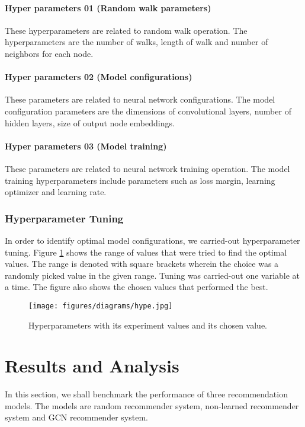 \documentclass{kththesis}
\begin{document}
\subsubsection{Hyper parameters 01 (Random walk parameters)}
\noindent These hyperparameters are related to random walk operation. The hyperparameters are the number of walks, length of walk and number of neighbors for each node.

\subsubsection{Hyper parameters 02 (Model configurations)}
\noindent These parameters are related to neural network configurations. The model configuration parameters are the dimensions of convolutional layers, number of hidden layers, size of output node embeddings.

\subsubsection{Hyper parameters 03 (Model training)}
\noindent These parameters are related to neural network training operation. The model training hyperparameters include parameters such as loss margin, learning optimizer and learning rate. 

\subsection{Hyperparameter Tuning}
In order to identify optimal model configurations, we carried-out hyperparameter tuning. Figure \ref{fig:hype} shows the range of values that were tried to find the optimal values. The range is denoted with square brackets wherein the choice was a randomly picked value in the given range. Tuning was carried-out one variable at a time. The figure also shows the chosen values that performed the best.

\begin{figure}[h!]
\centering
\texttt{[image: figures/diagrams/hype.jpg]}
\caption{Hyperparameters with its experiment values and its chosen value.}
\label{fig:hype}
\end{figure}

\chapter{Results and Analysis}
In this section, we shall benchmark the performance of three recommendation models. The models are random recommender system, non-learned recommender system and GCN recommender system.
\end{document}
